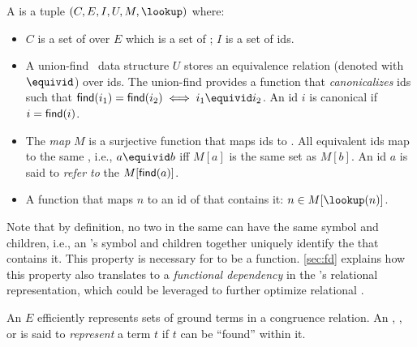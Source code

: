 {\begin{definition}
  A \egraph is a tuple $(C, E, I, U, M, \lookup)$ where:
  \begin{itemize}
    \item $C$ is a set of \eclasses over $E$ which is a set of \enodes;
    $I$ is a set of \eclass ids.
    \item
      A union-find~\cite{unionfind} data structure $U$
      stores an equivalence relation (denoted with $\equivid$)
      over \eclass ids.
      The union-find provides a function \find that
       \textit{canonicalizes} \eclass ids such that
       $\find(i_1) = \find(i_2) \iff i_1 \equivid i_2$.
      An \eclass id $i$ is canonical if $i = {\sf find}(i)$.
    
    \item
      The \textit{\eclass map} $M$ is a surjective function 
      that maps \eclass ids to \eclasses.
      All equivalent \eclass ids map to the same \eclass, i.e.,
      $a \equivid b$ iff $M[a]$ is the same set as $M[b]$.
      An \eclass id $a$ is said to \textit{refer to} the \eclass $M[{\sf find}(a)]$.
    
    \item
      A function \lookup that maps \enode $n$ to an id of
        \eclass that contains it: $n \in M[\lookup(n)]$.
    \end{itemize}
\end{definition}
}
 
Note that by definition, no two \enodes in the same \egraph 
 can have the same symbol and children, i.e.,
 an \enode's symbol and children together uniquely identify
 the \eclass that contains it.
This property is necessary for \lookup to be a function.
\autoref{sec:fd} explains how this property also
 translates to a {\em functional dependency}
 in the \egraph's relational representation,
 which could be leveraged to further optimize relational \ematching.


An \egraph $E$ efficiently represents sets of ground terms in a congruence
 relation.
An \egraph, \eclass, or \enode is said to \textit{represent} a term $t$ if $t$ can be
``found'' within it. 

